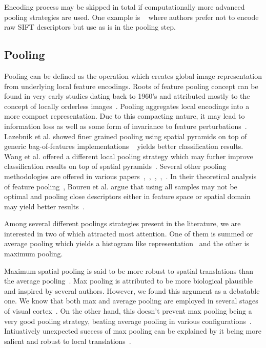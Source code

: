 \documentclass[conference]{IEEEtran}
\begin{document}
Encoding process may be skipped in total if computationally more advanced pooling strategies are used. One example is ~\cite{SecondOrderPooling} where authors prefer not to encode raw SIFT descriptors but use as is in the pooling step.

\subsection {Pooling}

Pooling can be defined as the operation which creates global image representation from underlying local feature encodings. Roots of feature pooling concept can be found in very early studies dating back to 1960's and attributed mostly to the concept of locally orderless images~\cite{boureau2010theoretical}. Pooling aggregates local encodings into a more compact representation. Due to this compacting nature, it may lead to information loss as well as some form of invariance to feature perturbations~\cite{6909713}. Lazebnik et al. showed finer grained pooling using spatial pyramids on top of generic bag-of-features implementations ~\cite{1238663} yields better classification results. Wang et al. offered a different local pooling strategy which may furher improve classification results on top of spatial pyramids~\cite{5540018}. Several other pooling methodologies are offered in various papers~\cite{Avila2013453},~\cite{6126555},~\cite{ObjectCentricPooling},~\cite{6248076},~\cite{SecondOrderPooling}. In their theoretical analysis of feature pooling~\cite{boureau2010theoretical}, Boureu et al. argue that using all samples may not be optimal and pooling close descriptors either in feature space or spatial domain may yield better results~\cite{6909713}.

Among several different poolings strategies present in the literature, we are interested in two of which attracted most attention. One of them is summed or average pooling which yields a histogram like representation~\cite{5539963} and the other is maximum pooling.

Maximum spatial pooling is said to be more robust to spatial translations than the average pooling~\cite{5206757}. Max pooling is attributed to be more biological plausible and inspired by several authors. However, we found this argument as a debatable one. We know that both max and average pooling are employed in several stages of visual cortex~\cite{6909713}. On the other hand, this doesn't prevent max pooling being a very good pooling strategy, beating average pooling in various configurations~\cite{5539963}. Intiuatively unexpected success of max pooling can be explained by it being more salient and robust to local translations~\cite{5539963}.
\end{document}
